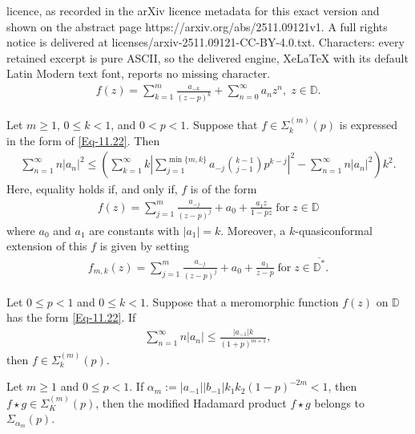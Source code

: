 \documentclass[10pt,a4paper]{amsart}
\begin{document}
licence, as recorded in the arXiv licence metadata for this exact version and shown on the abstract page https://arxiv.org/abs/2511.09121v1. A full rights notice is delivered at licenses/arxiv-2511.09121-CC-BY-4.0.txt. Characters: every retained excerpt is pure ASCII, so the delivered engine, XeLaTeX with its default Latin Modern text font, reports no missing character.
\begin{align}\label{Eq-11.22}
	f(z) = \sum_{k=1}^{m}\frac{a_{-k}}{(z-p)^k} + \sum_{n=0}^{\infty} a_n z^n,
\; z \in \mathbb{D}.
\end{align}

\begin{thm}\label{Th-1.2}
	Let $m \geq 1$, $0 \leq k < 1$, and $0 < p < 1$. Suppose that $f \in \Sigma_k^{(m)}(p)$ is expressed in the form of \eqref{Eq-11.22}. Then
	\begin{align}\label{Eq-2.3}
		\sum_{n=1}^\infty n |a_n|^2 \leq \left(\sum_{k=1}^{\infty} k \left| \sum_{j=1}^{\min\{m, k\}} a_{-j} \binom{k-1}{j-1} p^{k-j} \right|^2 - \sum_{n=1}^{\infty} n |a_{n}|^2 \right)k^2.
	\end{align}
	Here, equality holds if, and only if, $f$ is of the form
 \begin{align}\label{Eq-2.4}
 		f(z) = \sum_{j=1}^{m}\frac{a_{-j}}{(z-p)^j} + a_0 + \frac{a_1 z}{1 - p z}\; \mbox{for}\; z\in\mathbb{D}
 \end{align}
where $a_0$ and $a_1$ are constants with $|a_1| = k$. Moreover, a $k $-quasiconformal extension of this $f$ is given by setting
\begin{align}\label{Eq-2.5}
	f_{m,k}(z) = \sum_{j=1}^{m}\frac{a_{-j}}{(z-p)^j} + a_0 + \frac{a_1}{\bar{z} - p}\; \mbox{for}\; z\in\overline{\mathbb{D}^*}.
\end{align}
\end{thm}

\begin{cor}\label{Cor-1.1}
	Let $0 \leq p < 1$ and $0 \leq k < 1$. Suppose that a meromorphic function 
	$f(z)$ on $\mathbb{D}$ has the form \eqref{Eq-11.22}. If 
	\begin{align*}
		\sum_{n=1}^{\infty} n |a_n| \leq \frac{|a_{-1}|k}{(1+p)^{m+1}},
	\end{align*}
	then $f \in \Sigma^{(m)}_k(p)$.
\end{cor}

\begin{thm}\label{TH-1.2}
	Let $m\geq 1$ and $0\leq p<1$. 
	If $\alpha_m:=|a_{-1}||b_{-1}|{k_1k_2}{(1-p)^{-2m}}<1$, then $f\star g \in \Sigma^{(m)}_{K}(p)$, then the modified Hadamard product $f \star g$ belongs to $\Sigma_{\alpha_m}(p)$.  
\end{thm}
\end{document}
